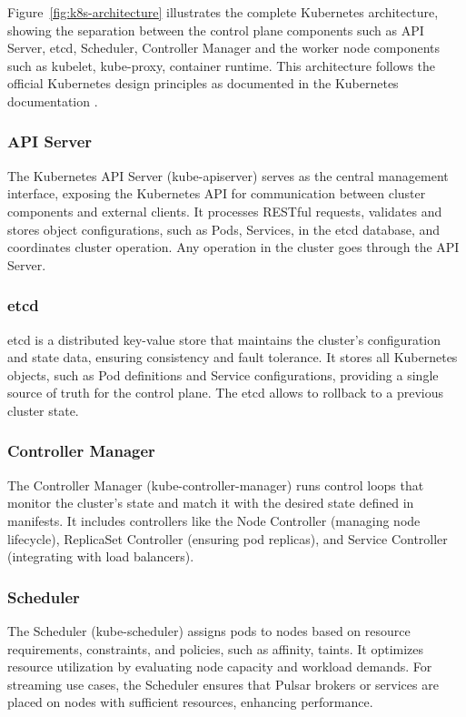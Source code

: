 Figure~\ref{fig:k8s-architecture} illustrates the complete Kubernetes architecture, showing the separation between the control plane components such as API Server, etcd, Scheduler, Controller Manager and the worker node components such as kubelet, kube-proxy, container runtime. This architecture follows the official Kubernetes design principles as documented in the Kubernetes documentation \cite{kubernetes-docs}.

\subsubsection{API Server}
The Kubernetes API Server (kube-apiserver) serves as the central management interface, exposing the Kubernetes API for communication between cluster components and external clients. It processes RESTful requests, validates and stores object configurations, such as Pods, Services, in the etcd database, and coordinates cluster operation. Any operation in the cluster goes through the API Server.

\subsubsection{etcd}
etcd is a distributed key-value store that maintains the cluster's configuration and state data, ensuring consistency and fault tolerance. It stores all Kubernetes objects, such as Pod definitions and Service configurations, providing a single source of truth for the control plane. The etcd allows to rollback to a previous cluster state.

\subsubsection{Controller Manager}
The Controller Manager (kube-controller-manager) runs control loops that monitor the cluster's state and match it with the desired state defined in manifests. It includes controllers like the Node Controller (managing node lifecycle), ReplicaSet Controller (ensuring pod replicas), and Service Controller (integrating with load balancers). 

\subsubsection{Scheduler}
The Scheduler (kube-scheduler) assigns pods to nodes based on resource requirements, constraints, and policies, such as affinity, taints. It optimizes resource utilization by evaluating node capacity and workload demands. For streaming use cases, the Scheduler ensures that Pulsar brokers or services are placed on nodes with sufficient resources, enhancing performance.

